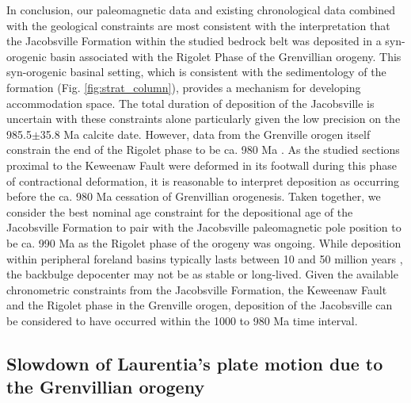 In conclusion, our paleomagnetic data and existing chronological data combined with the geological constraints are most consistent with the interpretation that the Jacobsville Formation within the studied bedrock belt was deposited in a syn-orogenic basin associated with the Rigolet Phase of the Grenvillian orogeny. This syn-orogenic basinal setting, which is consistent with the sedimentology of the formation (Fig. \ref{fig:strat_column}), provides a mechanism for developing accommodation space. The total duration of deposition of the Jacobsville is uncertain with these constraints alone particularly given the low precision on the 985.5$\pm$35.8 Ma calcite date. However, data from the Grenville orogen itself constrain the end of the Rigolet phase to be ca. 980 Ma \citep{Swanson-Hysell2023a}. As the studied sections proximal to the Keweenaw Fault were deformed in its footwall during this phase of contractional deformation, it is reasonable to interpret deposition as occurring before the ca. 980 Ma cessation of Grenvillian orogenesis. Taken together, we consider the best nominal age constraint for the depositional age of the Jacobsville Formation to pair with the Jacobsville paleomagnetic pole position to be ca. 990 Ma as the Rigolet phase of the orogeny was ongoing. While deposition within peripheral foreland basins typically lasts between 10 and 50 million years \citep{Woodcock2004a}, the backbulge depocenter may not be as stable or long-lived. Given the available chronometric constraints from the Jacobsville Formation, the Keweenaw Fault and the Rigolet phase in the Grenville orogen, deposition of the Jacobsville can be considered to have occurred within the 1000 to 980 Ma time interval.

\subsection*{Slowdown of Laurentia's plate motion due to the Grenvillian orogeny}


